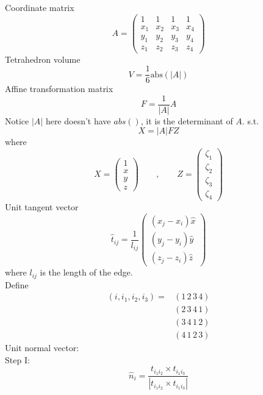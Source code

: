 \documentclass[a4paper,onecolumn]{article}
\begin{document}
\setcounter{page}{1}
\noindent Coordinate matrix
$$
A = \begin{pmatrix}
    1 & 1 & 1 & 1\\
    x_1 & x_2 & x_3 & x_4\\
    y_1 & y_2 & y_3 & y_4\\
    z_1 & z_2 & z_3 & z_4
\end{pmatrix}
$$
Tetrahedron volume
$$
    V = \frac{1}{6} \textrm{abs}( |A| )
$$
Affine transformation matrix
$$
    F = \frac{1}{\left|A\right|} A
$$
Notice $|A|$ here doesn't have $abs()$, it is the determinant of $A$.
s.t.
$$
    X = \left|A \right| F Z
$$
where
$$
    X = \begin{pmatrix}1\\x\\ y\\z\end{pmatrix}\qquad,\qquad
    Z = \begin{pmatrix}\zeta_1\\\zeta_2\\\zeta_3\\\zeta_4\end{pmatrix}
$$
Unit tangent vector
$$
    \hat{t}_{ij}=\frac{1}{l_{ij}}\begin{pmatrix}
        (x_j-x_i) \hat{x}\\
        (y_j-y_i) \hat{y}\\
        (z_j-z_i) \hat{z}
    \end{pmatrix}
$$
where $l_{ij}$ is the length of the edge.\\
Define
\begin{equation*}\begin{split}
    \left(i, i_1 , i_2, i_3\right) = &(1\,2\,3\,4)\\&(2\,3\,4\,1)\\&(3\,4\,1\,2)\\&(4\,1\,2\,3)
\end{split}\end{equation*}
Unit normal vector:\\
Step I:
$$
    \hat{n}_i = \frac{ t_{i_1i_2}\times t_{i_1i_3} } {\left|t_{i_1i_2}\times t_{i_1i_3}\right|}
$$
\end{document}
